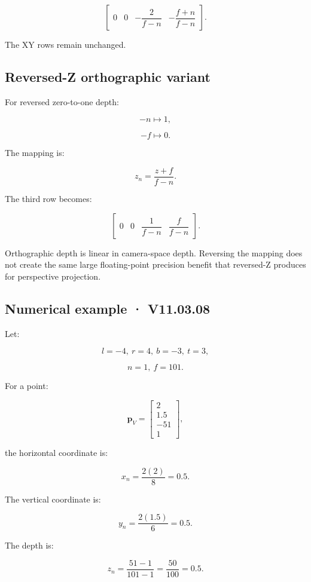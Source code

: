 \[
 \begin{bmatrix} 0&0&-\dfrac2{f-n}&-\dfrac{f+n}{f-n} \end{bmatrix}.
\]

The XY rows remain unchanged.

\subsection{Reversed-Z orthographic variant}\label{02-foundations-ii-ch033-reversed-z-orthographic-variant}

For reversed zero-to-one depth:

\[
 -n\mapsto1,
\]

\[
 -f\mapsto0.
\]

The mapping is:

\[
 \boxed{ z_n=\frac{z+f}{f-n} }.
\]

The third row becomes:

\[
 \begin{bmatrix} 0&0&\dfrac1{f-n}&\dfrac f{f-n} \end{bmatrix}.
\]

Orthographic depth is linear in camera-space depth. Reversing the mapping does not create the same large floating-point precision benefit that reversed-Z produces for perspective projection.

\subsection{Numerical example · V11.03.08}\label{02-foundations-ii-ch033-numerical-example-v11.03.08}

Let:

\[
 l=-4,\ r=4,\ b=-3,\ t=3,
\]

\[
 n=1,\ f=101.
\]

For a point:

\[
 \mathbf p_V= \begin{bmatrix}2\\1.5\\-51\\1\end{bmatrix},
\]

the horizontal coordinate is:

\[
 x_n=\frac{2(2)}8=0.5.
\]

The vertical coordinate is:

\[
 y_n=\frac{2(1.5)}6=0.5.
\]

The depth is:

\[
 z_n=\frac{51-1}{101-1}=\frac{50}{100}=0.5.
\]

